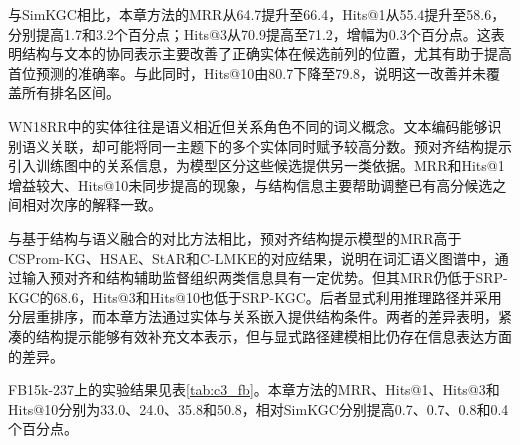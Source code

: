 与SimKGC相比，本章方法的MRR从64.7提升至66.4，Hits@1从55.4提升至58.6，分别提高1.7和3.2个百分点；Hits@3从70.9提高至71.2，增幅为0.3个百分点。这表明结构与文本的协同表示主要改善了正确实体在候选前列的位置，尤其有助于提高首位预测的准确率。与此同时，Hits@10由80.7下降至79.8，说明这一改善并未覆盖所有排名区间。

WN18RR中的实体往往是语义相近但关系角色不同的词义概念。文本编码能够识别语义关联，却可能将同一主题下的多个实体同时赋予较高分数。预对齐结构提示引入训练图中的关系信息，为模型区分这些候选提供另一类依据。MRR和Hits@1增益较大、Hits@10未同步提高的现象，与结构信息主要帮助调整已有高分候选之间相对次序的解释一致。

与基于结构与语义融合的对比方法相比，预对齐结构提示模型的MRR高于CSProm-KG、HSAE、StAR和C-LMKE的对应结果，说明在词汇语义图谱中，通过输入预对齐和结构辅助监督组织两类信息具有一定优势。但其MRR仍低于SRP-KGC的68.6，Hits@3和Hits@10也低于SRP-KGC。后者显式利用推理路径并采用分层重排序，而本章方法通过实体与关系嵌入提供结构条件。两者的差异表明，紧凑的结构提示能够有效补充文本表示，但与显式路径建模相比仍存在信息表达方面的差异。



FB15k-237上的实验结果见表\ref{tab:c3_fb}。本章方法的MRR、Hits@1、Hits@3和Hits@10分别为33.0、24.0、35.8和50.8，相对SimKGC分别提高0.7、0.7、0.8和0.4个百分点。

